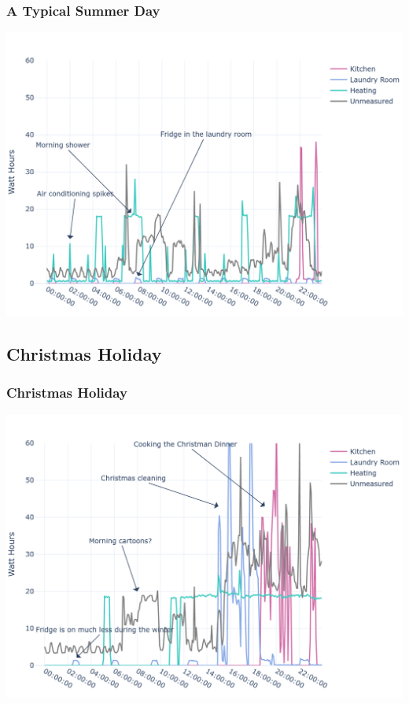 \documentclass[10pt]{beamer}
\begin{document}
\begin{frame}
\frametitle{A Typical Summer Day}

\bigskip
{
    \centering
    \includegraphics[width=\textwidth,height=\textheight,keepaspectratio]{20080607.png}
    \par
}
\bigskip

\end{frame}

\subsection{Christmas Holiday}

\begin{frame}
\frametitle{Christmas Holiday}

\bigskip
{
    \centering
    \includegraphics[width=\textwidth,height=\textheight,keepaspectratio]{20091224.png}
    \par
}
\bigskip

\end{frame}
\end{document}
